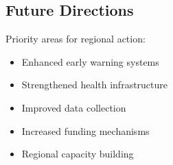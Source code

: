 \subsection{Future Directions}
Priority areas for regional action:

\begin{itemize}
    \item Enhanced early warning systems
    \item Strengthened health infrastructure
    \item Improved data collection
    \item Increased funding mechanisms
    \item Regional capacity building
\end{itemize}
